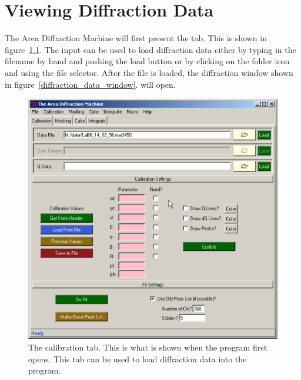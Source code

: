 \chapter{Viewing Diffraction Data}\label{viewing_data}

The Area Diffraction Machine will first present 
the  tab. This is shown in 
figure~\ref{calibration_tab}. The  input can be 
used to load diffraction data either by typing in the filename by hand 
and pushing the load button or by clicking on the folder icon and
using the file selector. After the file is loaded, 
the diffraction window shown in figure~\ref{diffraction_data_window}.
will open. 

\begin{figure}
    \centering
    \includegraphics[scale=.75]
    {figures/calibration_tab.eps}
    \caption{The calibration tab. This is what is 
    shown when the program first opens. This tab can be used
    to load diffraction data into the program.} 
    \label{calibration_tab}
\end{figure}

